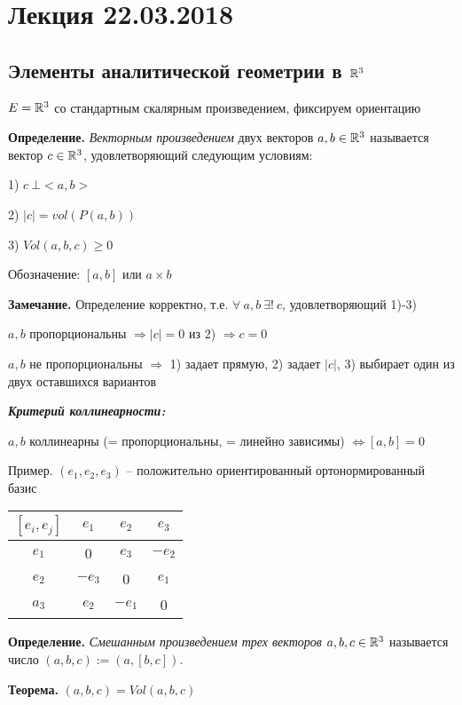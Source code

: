 \section{Лекция 22.03.2018}

\subsection{Элементы аналитической геометрии в $\mathbb{R}^3$}

$E =\mathbb{R}^3$ со стандартным скалярным произведением, фиксируем ориентацию 

\bigskip
\textbf{Определение.} \textit{Векторным произведением} двух векторов $a, b \in \mathbb{R}^3$ называется вектор $c \in \mathbb{R}^3$, удовлетворяющий следующим условиям:

1) $c \ \bot <a, b>$

2) $|c| = vol (P(a, b))$

3) $Vol(a, b, c) \geq 0$

Обозначение: $[a, b]$ или $a \times b$

\bigskip
\textbf{Замечание.} Определение корректно, т.е. $\forall \ a, b \ \exists! \ c$,  удовлетворяющий 1)-3)

$a, b$ пропорциональны $\Rightarrow |c| = 0$ из 2) $\Rightarrow c = 0$

$a, b$ не пропорциональны $\Rightarrow$ 1) задает прямую, 2) задает $|c|$, 3) выбирает один из двух оставшихся вариантов

\bigskip
\textbf{\textit{Критерий коллинеарности:}}

$a, b$ коллинеарны (= пропорциональны, = линейно зависимы) $\Leftrightarrow [a, b] = 0$

\bigskip
Пример. $(e_1, e_2, e_3)$ -- положительно ориентированный ортонормированный базис

\bigskip
\begin{tabular}{c|c|c|c}
$[e_i, e_j]$ & $e_1$ & $e_2$ & $e_3$ \\
\hline
$e_1$ & 0 & $e_3$ & $-e_2$  \\
\hline
$e_2$ & $-e_3$ & 0 & $e_1$   \\
\hline
$a_3$ & $e_2$ & $-e_1$ & 0   \\
\hline
\end{tabular}

\bigskip
\textbf{Определение.} \textit{Смешанным произведением трех векторов} $a, b, c \in \mathbb{R}^3$ называется число $(a, b, c) := (a, [b, c])$.

\bigskip
\textbf{Теорема.} $(a, b, c) = Vol(a, b, c)$

